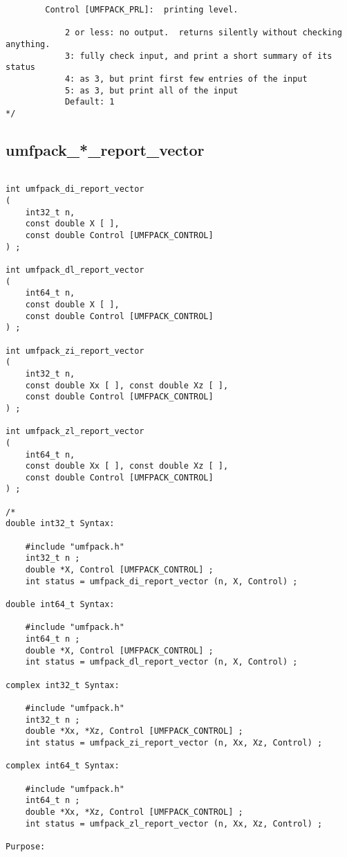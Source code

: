 \documentclass[11pt]{article}
\begin{document}
{\begin{verbatim}
        Control [UMFPACK_PRL]:  printing level.

            2 or less: no output.  returns silently without checking anything.
            3: fully check input, and print a short summary of its status
            4: as 3, but print first few entries of the input
            5: as 3, but print all of the input
            Default: 1
*/
\end{verbatim}
}

\newpage
\subsection{umfpack\_*\_report\_vector}

{\footnotesize
\begin{verbatim}

int umfpack_di_report_vector
(
    int32_t n,
    const double X [ ],
    const double Control [UMFPACK_CONTROL]
) ;

int umfpack_dl_report_vector
(
    int64_t n,
    const double X [ ],
    const double Control [UMFPACK_CONTROL]
) ;

int umfpack_zi_report_vector
(
    int32_t n,
    const double Xx [ ], const double Xz [ ],
    const double Control [UMFPACK_CONTROL]
) ;

int umfpack_zl_report_vector
(
    int64_t n,
    const double Xx [ ], const double Xz [ ],
    const double Control [UMFPACK_CONTROL]
) ;

/*
double int32_t Syntax:

    #include "umfpack.h"
    int32_t n ;
    double *X, Control [UMFPACK_CONTROL] ;
    int status = umfpack_di_report_vector (n, X, Control) ;

double int64_t Syntax:

    #include "umfpack.h"
    int64_t n ;
    double *X, Control [UMFPACK_CONTROL] ;
    int status = umfpack_dl_report_vector (n, X, Control) ;

complex int32_t Syntax:

    #include "umfpack.h"
    int32_t n ;
    double *Xx, *Xz, Control [UMFPACK_CONTROL] ;
    int status = umfpack_zi_report_vector (n, Xx, Xz, Control) ;

complex int64_t Syntax:

    #include "umfpack.h"
    int64_t n ;
    double *Xx, *Xz, Control [UMFPACK_CONTROL] ;
    int status = umfpack_zl_report_vector (n, Xx, Xz, Control) ;

Purpose:


\end{verbatim}}
\end{document}
